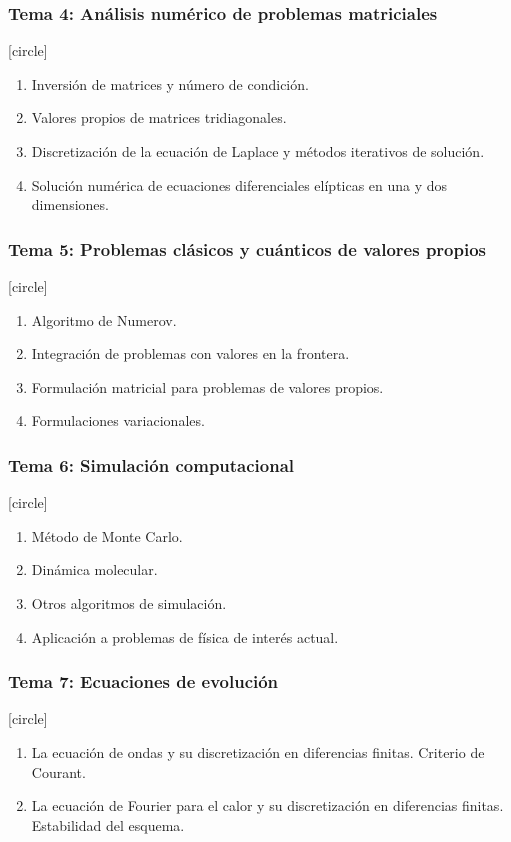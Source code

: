 \begin{frame}
\frametitle{\textbf{Tema 4: Análisis numérico de problemas matriciales}}
[circle]
\begin{enumerate}[<+->]
\item Inversión de matrices y número de condición.
\item Valores propios de matrices tridiagonales.
\item Discretización de la ecuación de Laplace y métodos iterativos de solución.
\item Solución numérica de ecuaciones diferenciales elípticas en una y dos dimensiones.
\end{enumerate}
\end{frame}
\begin{frame}
\frametitle{\textbf{Tema 5: Problemas clásicos y cuánticos de valores propios}}
[circle]
\begin{enumerate}[<+->]
\item Algoritmo de Numerov.
\item Integración de problemas con valores en la frontera.
\item Formulación matricial para problemas de valores propios.
\item Formulaciones variacionales.
\end{enumerate}
\end{frame}
\begin{frame}
\frametitle{\textbf{Tema 6: Simulación computacional}}
[circle]
\begin{enumerate}[<+->]
\item Método de Monte Carlo.
\item Dinámica molecular.
\item Otros algoritmos de simulación.
\item Aplicación a problemas de física de interés actual.
\end{enumerate}
\end{frame}
\begin{frame}
\frametitle{\textbf{Tema 7: Ecuaciones de evolución}}
[circle]
\begin{enumerate}[<+->]
\item La ecuación de ondas y su discretización en diferencias finitas. Criterio de Courant.
\item La ecuación de Fourier para el calor y su discretización en diferencias finitas. Estabilidad del esquema.
\end{enumerate}
\end{frame}
